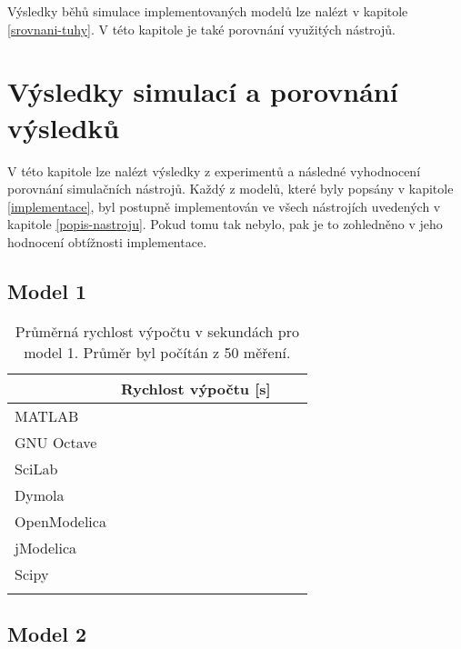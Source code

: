 

Výsledky běhů simulace implementovaných modelů lze nalézt v kapitole \ref{srovnani-tuhy}. V této kapitole je také porovnání využitých nástrojů.

\chapter{Výsledky simulací a porovnání výsledků}
\label{kapitola5}
V této kapitole lze nalézt výsledky z experimentů a následné vyhodnocení porovnání simulačních nástrojů. Každý z modelů, které byly popsány v kapitole \ref{implementace}, byl postupně implementován ve všech nástrojích uvedených v kapitole \ref{popis-nastroju}. Pokud tomu tak nebylo, pak je to zohledněno v jeho hodnocení obtížnosti implementace.

\section{Model 1}
\label{srovnani-micek}


\begin{table}[ht]
\centering
\begin{tabular}{|l|l|l|l|}
\hline
             & Rychlost výpočtu {[}s{]} &  &  \\ \hline
MATLAB       &                          &  &  \\ \hline
GNU Octave   &                          &  &  \\ \hline
SciLab       &                          &  &  \\ \hline
Dymola       &                          &  &  \\ \hline
OpenModelica &                          &  &  \\ \hline
jModelica    &                          &  &  \\ \hline
Scipy        &                          &  &  \\ \hline
             &                          &  &  \\ \hline
\end{tabular}
\caption{Průměrná rychlost výpočtu v sekundách pro model 1. Průměr byl počítán z 50 měření.}
\label{tab:micek-tabulka}
\end{table}

\section{Model 2}
\label{srovnani-kruh}


